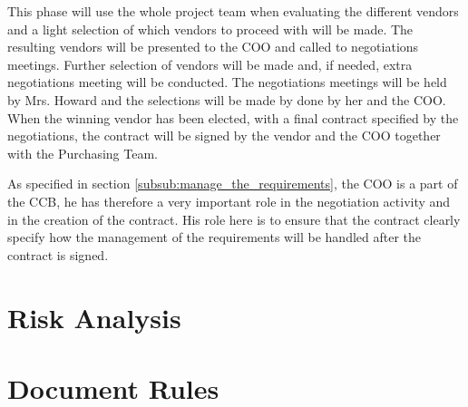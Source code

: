 \documentclass[a4paper]{article}
\begin{document}
This phase will use the whole project team when evaluating the different vendors and a light selection of which vendors to proceed with will be made. The resulting vendors will be presented to the COO and called to negotiations meetings. Further selection of vendors will be made and, if needed, extra negotiations meeting will be conducted. The negotiations meetings will be held by Mrs. Howard and the selections will be made by done by her and the COO. When the winning vendor has been elected, with a final contract specified by the negotiations, the contract will be signed by the vendor and the COO together with the Purchasing Team.

As specified in section \ref{subsub:manage_the_requirements}, the COO is a part of the CCB, he has therefore a very important role in the negotiation activity and in the creation of the contract. His role here is to ensure that the contract clearly specify how the management of the requirements will be handled after the contract is signed.
 
\section{Risk Analysis}
\label{sec:risk_analysis}

\section{Document Rules} 
\label{sec:document_rules}
\end{document}
